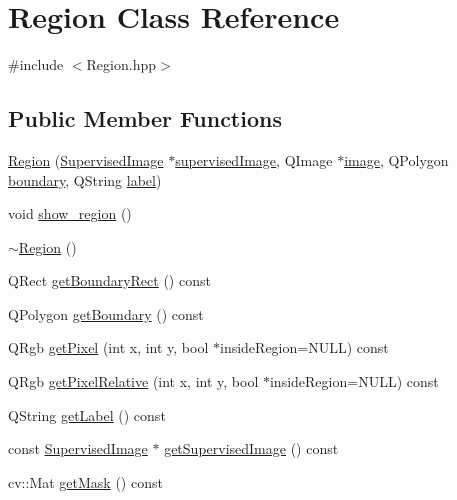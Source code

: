 \hypertarget{class_region}{\section{Region Class Reference}
\label{class_region}
}


{\ttfamily \#include $<$Region.\+hpp$>$}

\subsection*{Public Member Functions}
\begin{DoxyCompactItemize}
\item 
\hyperlink{class_region_a1f79fb89521984fd4ec62b30c67712cf}{Region} (\hyperlink{class_supervised_image}{Supervised\+Image} $\ast$\hyperlink{class_region_a897932b50cdd155984c06575726f9b69}{supervised\+Image}, Q\+Image $\ast$\hyperlink{class_region_a090b8bc9a8c73f8f874d8d439a0843be}{image}, Q\+Polygon \hyperlink{class_region_a4a59ef37013f3a6515a79317b0f0b4c0}{boundary}, Q\+String \hyperlink{_label_feature_8hpp_a331f639078ba664b292b59c4032245e1}{label})
\item 
void \hyperlink{class_region_ad2572028c1a4653a14dbfb1b622aa03e}{show\+\_\+region} ()
\item 
\hyperlink{class_region_a3c3670fff78f7511d156e3b2f0bc6266}{$\sim$\+Region} ()
\item 
Q\+Rect \hyperlink{class_region_a12c653b5aa89c899e2680c9dc1bbf46d}{get\+Boundary\+Rect} () const 
\item 
Q\+Polygon \hyperlink{class_region_a0c258b6ce768a3df3d0260c2ab19c343}{get\+Boundary} () const 
\item 
Q\+Rgb \hyperlink{class_region_acc0edaac14854ccc448f419844a722bf}{get\+Pixel} (int x, int y, bool $\ast$inside\+Region=N\+U\+L\+L) const 
\item 
Q\+Rgb \hyperlink{class_region_a421786f57555f6348ece3fa33eb86594}{get\+Pixel\+Relative} (int x, int y, bool $\ast$inside\+Region=N\+U\+L\+L) const 
\item 
Q\+String \hyperlink{class_region_a69d5acb5d1d81b50f225817217f60fdd}{get\+Label} () const 
\item 
const \hyperlink{class_supervised_image}{Supervised\+Image} $\ast$ \hyperlink{class_region_a8c39ae6d7143a47423f6403c80742bd5}{get\+Supervised\+Image} () const 
\item 
cv\+::\+Mat \hyperlink{class_region_add72dd82adb6ee0d5822b250c3ac07e8}{get\+Mask} () const 
\end{DoxyCompactItemize}

